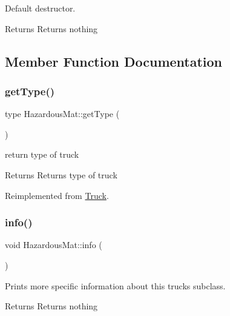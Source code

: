 Default destructor. 

\begin{DoxyReturn}{Returns}
Returns nothing 
\end{DoxyReturn}


\subsection{Member Function Documentation}
\mbox{\label{class_hazardous_mat_aed587121cdff185be91ad9ec5ba4d380}} 
\subsubsection{\texorpdfstring{get\+Type()}{getType()}}
{\footnotesize\ttfamily type Hazardous\+Mat\+::get\+Type (\begin{DoxyParamCaption}{ }\end{DoxyParamCaption})\hspace{0.3cm}{\ttfamily [virtual]}}



return type of truck 

\begin{DoxyReturn}{Returns}
Returns type of truck 
\end{DoxyReturn}


Reimplemented from \hyperlink{class_truck_a24406caf4d09be7f3eff069ce6bc015b}{Truck}.

\mbox{\label{class_hazardous_mat_ab07463da3e9a5d3b8933d2b01332ed00}} 
\subsubsection{\texorpdfstring{info()}{info()}}
{\footnotesize\ttfamily void Hazardous\+Mat\+::info (\begin{DoxyParamCaption}{ }\end{DoxyParamCaption})\hspace{0.3cm}{\ttfamily [virtual]}}



Prints more specific information about this truck\textquotesingle{}s subclass. 

\begin{DoxyReturn}{Returns}
Returns nothing 
\end{DoxyReturn}



